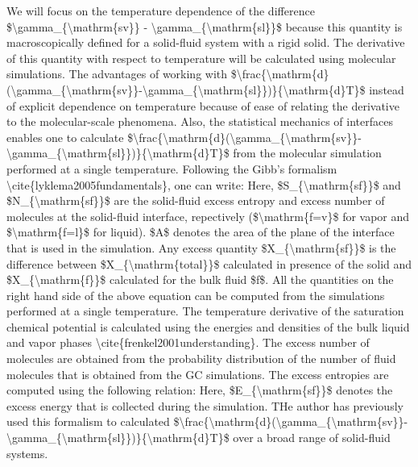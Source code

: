 \par We will focus on the temperature dependence of the difference \$\textbackslash gamma\_\{\textbackslash mathrm\{sv\}\} - \textbackslash gamma\_\{\textbackslash mathrm\{sl\}\}\$ because this quantity is macroscopically defined for a solid-fluid system with a rigid solid. The derivative of this quantity with respect to temperature will be calculated using molecular simulations. The advantages of working with \$\textbackslash frac\{\textbackslash mathrm\{d\}(\textbackslash gamma\_\{\textbackslash mathrm\{sv\}\}-\textbackslash gamma\_\{\textbackslash mathrm\{sl\}\})\}\{\textbackslash mathrm\{d\}T\}\$ instead of explicit dependence on temperature because of ease of relating the derivative to the molecular-scale phenomena. Also, the statistical mechanics of interfaces enables one to calculate \$\textbackslash frac\{\textbackslash mathrm\{d\}(\textbackslash gamma\_\{\textbackslash mathrm\{sv\}\}-\textbackslash gamma\_\{\textbackslash mathrm\{sl\}\})\}\{\textbackslash mathrm\{d\}T\}\$ from the molecular simulation performed at a single temperature. Following the Gibb's formalism \textbackslash cite\{lyklema2005fundamentals\}, one can write: Here, \$S\_\{\textbackslash mathrm\{sf\}\}\$ and \$N\_\{\textbackslash mathrm\{sf\}\}\$ are the solid-fluid excess entropy and excess number of molecules at  the solid-fluid interface, repectively (\$\textbackslash mathrm\{f=v\}\$ for vapor and \$\textbackslash mathrm\{f=l\}\$ for liquid). \$A\$ denotes the area of the plane of the interface that is used in the simulation. Any excess quantity \$X\_\{\textbackslash mathrm\{sf\}\}\$ is the difference between \$X\_\{\textbackslash mathrm\{total\}\}\$ calculated in presence of the solid and \$X\_\{\textbackslash mathrm\{f\}\}\$ calculated for the bulk fluid \$f\$. All the quantities on the right hand side of the above equation can be computed from the simulations performed at a single temperature. The temperature derivative of the saturation chemical potential is calculated using the energies and densities of the bulk liquid and vapor phases \textbackslash cite\{frenkel2001understanding\}. The excess number of molecules are obtained from the probability distribution of the number of fluid molecules that is obtained from the GC simulations. The excess entropies are computed using the following relation: Here, \$E\_\{\textbackslash mathrm\{sf\}\}\$ denotes the excess energy that is collected during the simulation. THe author has previously used this formalism to calculated \$\textbackslash frac\{\textbackslash mathrm\{d\}(\textbackslash gamma\_\{\textbackslash mathrm\{sv\}\}-\textbackslash gamma\_\{\textbackslash mathrm\{sl\}\})\}\{\textbackslash mathrm\{d\}T\}\$ over a broad range of solid-fluid systems.
